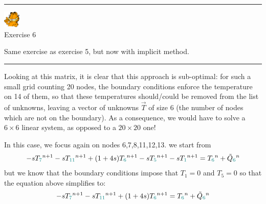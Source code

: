 \begin{center}
\begin{minipage}[t]{0.77\textwidth}
\par\noindent\rule{\textwidth}{0.4pt}
\begin{center}
\includegraphics[width=0.8cm]{images/garftr} \\
{\color{orange}Exercise 6}
\end{center}

Same exercise as exercise 5, but now with implicit method.

\par\noindent\rule{\textwidth}{0.4pt}
\end{minipage}
\end{center}






Looking at this matrix, it is clear that this approach is sub-optimal: for such a small grid counting
20 nodes, the boundary conditions enforce the temperature on 14 of them, so that these
temperatures should/could be removed from the list of unknowns, leaving a vector 
of unknowns $\vec{T}$ of size 6 (the number of nodes which are not on the boundary).
As a consequence, we would have to solve a $6\times 6$ linear system, as opposed to a $20\times 20$ one!

In this case, we focus again on nodes 6,7,8,11,12,13.
we start from 
\[
-s T_{\color{teal} 7}^{n+1}-s T_{\color{teal} 11}^{n+1} +(1+4s)T_{\color{teal} 6}^{n+1} -s T_{\color{teal} 5}^{n+1} -s T_{\color{teal} 1}^{n+1} 
= T_{\color{teal} 6}^n +\tilde{Q}_{\color{teal} 6}^n
\]
but we know that the boundary conditions impose that $T_1=0$ and $T_5=0$ so that the equation above simplifies to:
\[
-s T_{\color{teal} 7}^{n+1}-s T_{\color{teal} 11}^{n+1} +(1+4s)T_{\color{teal} 6}^{n+1} 
= T_{\color{teal} 6}^n +\tilde{Q}_{\color{teal} 6}^n
\]

